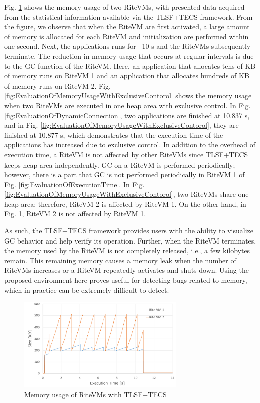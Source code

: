 \documentclass[JIP]{ipsj_v2/UTF8/ipsj}
\begin{document}
Fig. \ref{fig:EvaluationOfTLSFStatistics} shows the memory usage of two RiteVMs, with presented data acquired from the statistical information available via the TLSF+TECS framework.
From the figure, we observe that when the RiteVM are first activated, a large amount of memory is allocated for each RiteVM and initialization are performed within one second.
Next, the applications runs for ~10 s and the RiteVMs subsequently terminate.
The reduction in memory usage that occurs at regular intervals is due to the GC function of the RiteVM.
Here, an application that allocates tens of KB of memory runs on RiteVM 1 and an application that allocates hundreds of KB of memory runs on RiteVM 2.
Fig. \ref{fig:EvaluationOfMemoryUsageWithExclusiveContorol} shows the memory usage when two RiteVMs are executed in one heap area with exclusive control.
In Fig. \ref{fig:EvaluationOfDynamicConnection}, two applications are finished at 10.837 s, and in Fig. \ref{fig:EvaluationOfMemoryUsageWithExclusiveContorol}, they are finished at 10.877 s, which demonstrates that the execution time of the applications has increased due to exclusive control.
In addition to the overhead of execution time, a RiteVM is not affected by other RiteVMs since TLSF+TECS keeps heap area independently.
GC on a RiteVM is performed periodically; however, there is a part that GC is not performed periodically in RiteVM 1 of Fig. \ref{fig:EvaluationOfExecutionTime}.
In Fig. \ref{fig:EvaluationOfMemoryUsageWithExclusiveContorol}, two RiteVMs share one heap area; therefore, RiteVM 2 is affected by RiteVM 1.
On the other hand, in Fig. \ref{fig:EvaluationOfTLSFStatistics}, RiteVM 2 is not affected by RiteVM 1.

As such, the TLSF+TECS framework provides users with the ability to visualize GC behavior and help verify its operation.
Further, when the RiteVM terminates, the memory used by the RiteVM is not completely released, i.e., a few kilobytes remain.
This remaining memory causes a memory leak when the number of RiteVMs increases or a RiteVM repeatedly activates and shuts down.
Using the proposed environment here proves useful for detecting bugs related to memory, which in practice can be extremely difficult to detect.

\begin{figure}[t]
    \centering
    \includegraphics[width=8cm,clip]{figure/EvaluationOfTLSFStatistics.pdf}
    \caption{Memory usage of RiteVMs with TLSF+TECS}
    \label{fig:EvaluationOfTLSFStatistics}
\end{figure}
\end{document}
